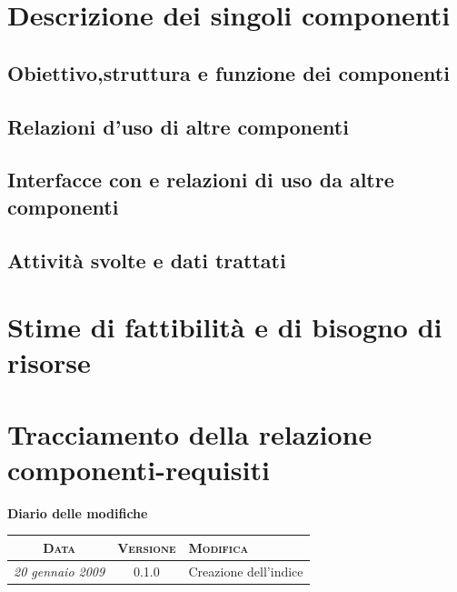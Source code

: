 \documentclass[11pt,a4paper]{article}
\newcommand{\modifiche} 
{
\newpage
\begin{center}
\textbf{Diario delle modifiche} \\
\bigskip
\begin{tabular}{|c|c|p{0.51\textwidth}|}
\hline
\textsc{Data} & \textsc{Versione} & \textsc{Modifica} \\
\hline
\hline
\textit{20 gennaio 2009} & 0.1.0 & Creazione dell'indice \\
\hline
\end{tabular}
\end{center}
}
\begin{document}
\section{Descrizione dei singoli componenti}
\subsection{Obiettivo,struttura e funzione dei componenti}
\subsection{Relazioni d'uso di altre componenti}
\subsection{Interfacce con e relazioni di uso da altre componenti}
\subsection{Attività svolte e dati trattati}
\section{Stime di fattibilità e di bisogno di risorse}
\section{Tracciamento della relazione componenti-requisiti}
\modifiche
\end{document}
